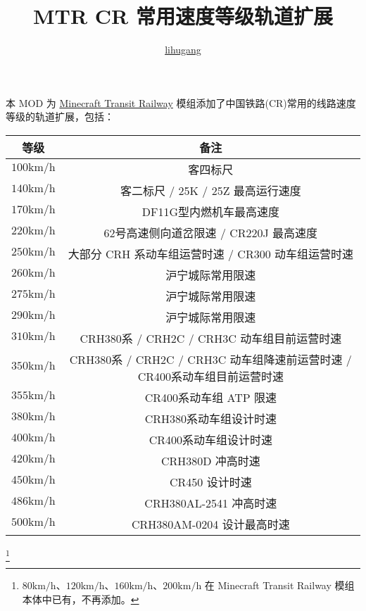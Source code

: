 \documentclass{article}
\title{MTR CR 常用速度等级轨道扩展}
\author{\href{https://github.com/lihugang/mtr-cr-speed-rails}{lihugang}}
\begin{document}
\maketitle

本 MOD 为 \href{https://minecrafttransitrailway.com/}{Minecraft Transit Railway} 模组添加了中国铁路(CR)常用的线路速度等级的轨道扩展，包括：

\begin{table}[!ht]
    \centering
    \begin{tabular}{|c|c|}
    \hline
        等级 & 备注 \\ \hline
        $100 \textrm{km/h}$ & 客四标尺 \\ \hline
        $140 \textrm{km/h}$ & 客二标尺 / 25K / 25Z 最高运行速度 \\ \hline
        $170 \textrm{km/h}$ & DF11G型内燃机车最高速度 \\ \hline
        $220 \textrm{km/h}$ & 62号高速侧向道岔限速 / CR220J 最高速度 \\ \hline
        $250 \textrm{km/h}$ & 大部分 CRH 系动车组运营时速 / CR300 动车组运营时速 \\ \hline
        $260 \textrm{km/h}$ & 沪宁城际常用限速 \\ \hline
        $275 \textrm{km/h}$ & 沪宁城际常用限速 \\ \hline
        $290 \textrm{km/h}$ & 沪宁城际常用限速 \\ \hline
        $310 \textrm{km/h}$ & CRH380系 / CRH2C / CRH3C 动车组目前运营时速 \\ \hline
        $350 \textrm{km/h}$ & CRH380系 / CRH2C / CRH3C 动车组降速前运营时速 / CR400系动车组目前运营时速 \\ \hline
        $355 \textrm{km/h}$ & CR400系动车组 ATP 限速 \\ \hline
        $380 \textrm{km/h}$ & CRH380系动车组设计时速 \\ \hline
        $400 \textrm{km/h}$ & CR400系动车组设计时速 \\ \hline
        $420 \textrm{km/h}$ & CRH380D 冲高时速 \\ \hline
        $450 \textrm{km/h}$ & CR450 设计时速 \\ \hline
        $486 \textrm{km/h}$ & CRH380AL-2541 冲高时速 \\ \hline
        $500 \textrm{km/h}$ & CRH380AM-0204 设计最高时速 \\ \hline
    \end{tabular}
\end{table}
\footnote{$80\textrm{km/h}$、$120\textrm{km/h}$、$160\textrm{km/h}$、$200\textrm{km/h}$ 在 Minecraft Transit Railway 模组本体中已有，不再添加。}
\end{document}
